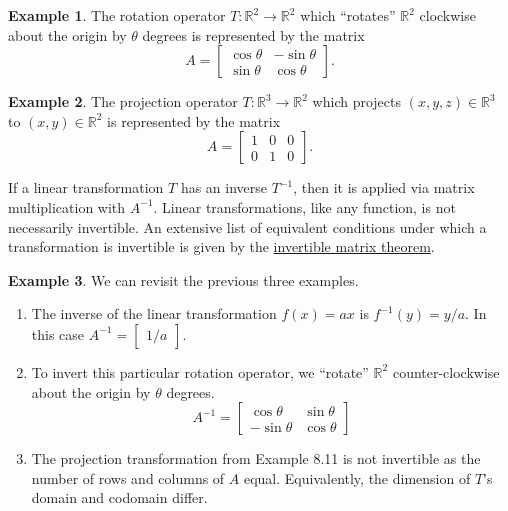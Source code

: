 \documentclass{article}
\newcommand{\R}{\mathbb{R}}
\theoremstyle{definition}
\newtheorem{example}{Example}[section]
\begin{document}
\begin{example}
	The rotation operator $ T:\R^2\to\R^2 $ which ``rotates'' $ \R^2 $ clockwise about the origin by $ \theta $ degrees is represented by the matrix $$ A = \begin{bmatrix}
		\cos\theta & -\sin\theta \\\sin\theta&\cos\theta
	\end{bmatrix}.$$
\end{example}
\begin{example}
	The projection operator $ T:\R^3\to\R^2 $ which projects $ (x,y,z)\in\R^3 $ to $ (x,y)\in\R^2 $ is represented by the matrix 
	$$ A = \begin{bmatrix}
		1&0&0\\0&1&0
	\end{bmatrix}.$$
\end{example}
If a linear transformation $ T $ has an inverse $ T^{-1} $, then it is applied via matrix multiplication with $ A^{-1} $. Linear transformations, like any function, is not necessarily invertible. An extensive list of equivalent conditions under which a transformation is invertible is given by the \href{https://mathworld.wolfram.com/InvertibleMatrixTheorem.html}{invertible matrix theorem}.
\begin{example} We can revisit the previous three examples. 
	\begin{enumerate}
		\item The inverse of the linear transformation $ f(x)=ax $ is $ f^{-1}(y)=y/a $. In this case $ A^{-1}=\begin{bmatrix}
			1/a
		\end{bmatrix} $. 
		\item To invert this particular rotation operator, we ``rotate'' $ \R^2 $ counter-clockwise about the origin by $ \theta $ degrees. 
		$$ A^{-1}= \begin{bmatrix}
			\cos\theta & \sin\theta \\-\sin\theta&\cos\theta
		\end{bmatrix}$$
		\item The projection transformation from Example 8.11 is not invertible as the number of rows and columns of $ A $  equal. Equivalently, the dimension of $ T $'s domain and codomain differ.
	\end{enumerate}
\end{example}
\end{document}
